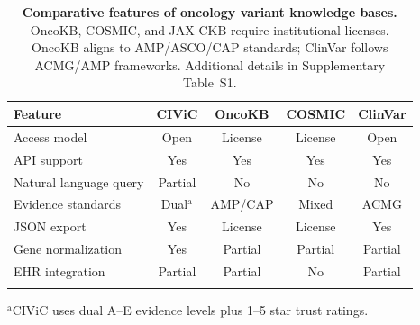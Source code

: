 % 
%

\clearpage

\begin{table}[p]
\caption{\textbf{Comparative features of oncology variant knowledge bases.} OncoKB, COSMIC, and JAX-CKB require institutional licenses. OncoKB aligns to AMP/ASCO/CAP standards; ClinVar follows ACMG/AMP frameworks. Additional details in Supplementary Table~S1.}\label{tab1}
\centering
\begin{tabular}{@{}lcccc@{}}
\toprule
\textbf{Feature} & \textbf{CIViC} & \textbf{OncoKB} & \textbf{COSMIC} & \textbf{ClinVar} \\
\midrule
Access model & Open & License & License & Open \\
API support & Yes & Yes & Yes & Yes \\
Natural language query & Partial & No & No & No \\
Evidence standards & Dual$^{\mathrm{a}}$ & AMP/CAP & Mixed & ACMG \\
JSON export & Yes & License & License & Yes \\
Gene normalization & Yes & Partial & Partial & Partial \\
EHR integration & Partial & Partial & No & Partial \\
\botrule
\end{tabular}

\medskip
\raggedright\small
$^{\mathrm{a}}$CIViC uses dual A--E evidence levels plus 1--5 star trust ratings.
\end{table}

%
%
%
%
%
%
%
%
%
%
%

